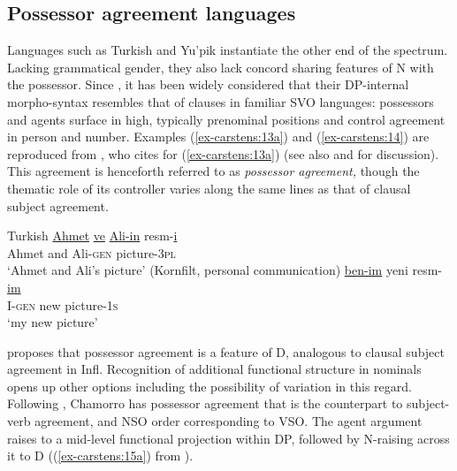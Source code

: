\documentclass[output=paper
,modfonts
,nonflat]{langsci/langscibook}
\begin{document}
\subsection{Possessor agreement languages} \label{sec-carstens:2.2}
Languages such as Turkish and Yu'pik instantiate the other end of the spectrum. Lacking grammatical gender, they also lack concord sharing features of N with the possessor. Since \citet{Abney1987}, it has been widely considered that their DP-internal morpho-syntax resembles that of clauses in familiar SVO languages: possessors and agents surface in high, typically prenominal positions and control agreement in person and number. Examples (\ref{ex-carstens:13a}) and (\ref{ex-carstens:14}) are reproduced from \citet{Abney1987}, who cites \citet{Underhill1976} for (\ref{ex-carstens:13a}) (see also \citealt{Gavruseva2000} and \citealt{Haegeman2004} for discussion). This agreement is henceforth referred to as \textit{possessor agreement,} though the thematic role of its controller varies along the same lines as that of clausal subject agreement. 

\begin{exe}
	\ex Turkish \label{ex-carstens:13}
	\xlist
	\ex \label{ex-carstens:13a}
	\gll \underline{Ahmet} \underline{ve} \underline{Ali-in}     resm-\underline{i}  \\
	Ahmet and Ali-\textsc{gen}   picture-3\textsc{pl}\\
	\glt `Ahmet and Ali's picture'  	
	\ex (Kornfilt, personal communication) \newline
	\gll \underline{ben-im}   yeni  resm-\underline{im}\\
	I-\textsc{gen}  new   picture-1\textsc{s}\\
	\glt `my new picture'
	\endxlist
\end{exe}

\citet{Abney1987} proposes that possessor agreement is a feature of D, analogous to clausal subject agreement in Infl. Recognition of additional functional structure in nominals opens up other options including the possibility of variation in this regard. Following \citet{Chung1982}, Chamorro has possessor agreement that is the counterpart to subject-verb agreement, and NSO order corresponding to VSO. The agent argument raises to a mid-level functional projection within DP, followed by N-raising across it to D ((\ref{ex-carstens:15a}) from \citealt[127]{Chung1982}).
\end{document}
